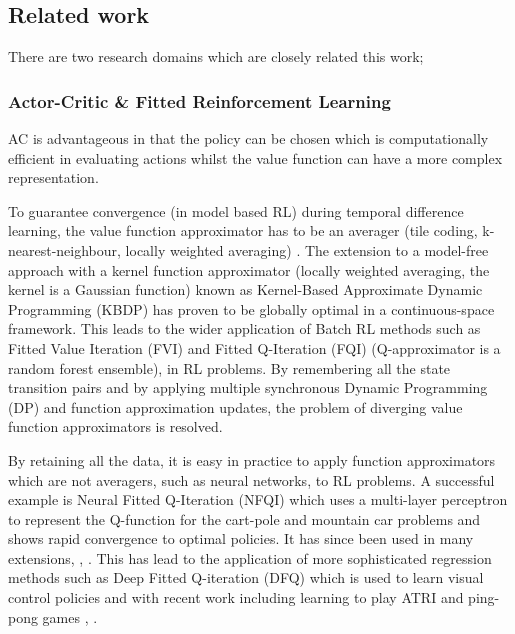 \documentclass[final,5p,times,twocolumn]{elsarticle}
\begin{document}
\subsection{Related work}
There are two research domains which are closely related this work;
\subsubsection{Actor-Critic \& Fitted Reinforcement Learning}

 AC is advantageous in that the policy can be chosen which 
is computationally efficient in evaluating actions whilst the value function can have a more complex representation.

To guarantee convergence (in model based RL) during temporal difference learning, 
the value function approximator has to be an averager (tile coding, k-nearest-neighbour, locally weighted averaging) 
\cite{stable_FA_gordon_1995}. The extension to a model-free approach with a kernel function approximator 
(locally weighted averaging, the kernel is a Gaussian function) known as Kernel-Based Approximate Dynamic Programming (KBDP) \cite{kernel_rl_ormoneit_2002}
has proven to be globally optimal in a continuous-space framework. This leads to the wider application of Batch RL methods 
such as Fitted Value Iteration (FVI) \cite{fvi_uav_2010} and Fitted Q-Iteration (FQI) \cite{EGW05} (Q-approximator is a random forest ensemble),
\cite{fqi_nips_peter_2009} in RL problems. By remembering all the state transition pairs and by applying multiple 
synchronous Dynamic Programming (DP) and function approximation updates, the problem of diverging value function approximators is resolved. 

By retaining all the data, it is easy in practice to apply function approximators which are not averagers, such as neural networks,
to RL problems. A successful example is Neural Fitted Q-Iteration (NFQI) \cite{Riedmiller2005} which 
uses a multi-layer perceptron to represent the Q-function for the cart-pole and mountain car problems and 
shows rapid convergence to optimal policies. It has since been used in many extensions, \cite{NAC_2008}, \cite{rl_gmm_2010}.
This has lead to the application of more sophisticated regression methods such as 
Deep Fitted Q-iteration (DFQ) \cite{Lange_riedmiller_2010} which is used to learn visual control policies
and with recent work including learning to play ATRI and ping-pong games \cite{mnih-dqn-2015}, \cite{DRQ_AAAI_2015}. 
\end{document}
